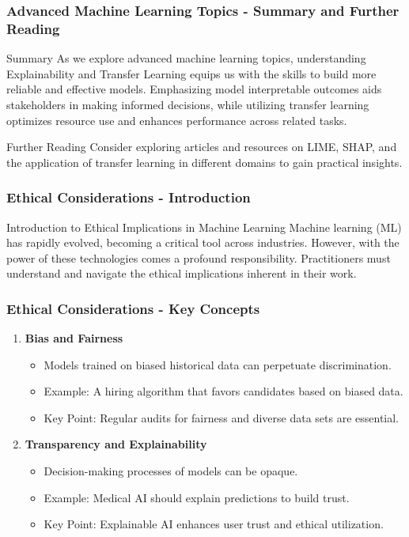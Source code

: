 \documentclass[aspectratio=169]{beamer}
\begin{document}
\begin{frame}[fragile]
  \frametitle{Advanced Machine Learning Topics - Summary and Further Reading}
  \begin{block}{Summary}
    As we explore advanced machine learning topics, understanding Explainability and Transfer Learning equips us with the skills to build more reliable and effective models.
    Emphasizing model interpretable outcomes aids stakeholders in making informed decisions, 
    while utilizing transfer learning optimizes resource use and enhances performance across related tasks.
  \end{block}
  
  \begin{block}{Further Reading}
    Consider exploring articles and resources on LIME, SHAP, and the application of transfer learning in different domains to gain practical insights.
  \end{block}
\end{frame}

\begin{frame}[fragile]
    \frametitle{Ethical Considerations - Introduction}
    \begin{block}{Introduction to Ethical Implications in Machine Learning}
        Machine learning (ML) has rapidly evolved, becoming a critical tool across industries. 
        However, with the power of these technologies comes a profound responsibility. 
        Practitioners must understand and navigate the ethical implications inherent in their work.
    \end{block}
\end{frame}

\begin{frame}[fragile]
    \frametitle{Ethical Considerations - Key Concepts}
    \begin{enumerate}
        \item \textbf{Bias and Fairness}
            \begin{itemize}
                \item Models trained on biased historical data can perpetuate discrimination.
                \item Example: A hiring algorithm that favors candidates based on biased data.
                \item Key Point: Regular audits for fairness and diverse data sets are essential.
            \end{itemize}
        
        \item \textbf{Transparency and Explainability}
            \begin{itemize}
                \item Decision-making processes of models can be opaque.
                \item Example: Medical AI should explain predictions to build trust.
                \item Key Point: Explainable AI enhances user trust and ethical utilization.
            \end{itemize}
    \end{enumerate}
\end{frame}
\end{document}
